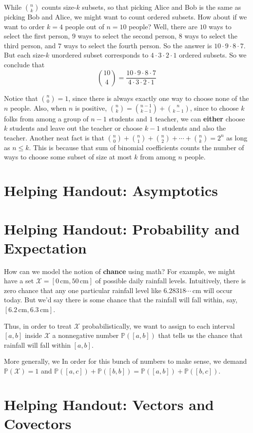 \documentclass{article}
\newcommand{\PP}{\mathbb{P}}
\newcommand{\Xx}{\mathcal{X}}
\begin{document}
        While ${n\choose k}$ counts size-$k$ subsets, so that picking Alice 
        and Bob is the same as picking Bob and Alice, we might want to count
        ordered subsets.
        How about if we want to order $k=4$ people out of $n=10$ people?
        Well, there are $10$ ways to select the first person,
                         $9$ ways to select the second person,
                         $8$ ways to select the third person, and
                         $7$ ways to select the fourth person.
        So the answer is $10\cdot 9\cdot 8\cdot 7$.
        But each size-$k$ unordered subset corresponds to
        $4\cdot 3\cdot 2\cdot 1$ ordered subsets.  So we conclude that
        $$
            {10\choose 4} = \frac{10\cdot 9\cdot 8\cdot 7}{4\cdot 3\cdot 2\cdot 1} 
        $$

        Notice that ${n \choose 0} = 1$, since there is always exactly one way
        to choose none of the $n$ people.
        Also, when $n$ is positive, ${n\choose k} = {n-1\choose k-1} +
        {n\choose k-1}$, since to choose $k$ folks from among a group of $n-1$
        students and $1$ teacher, we can \textbf{either} choose $k$ students
        and leave out the teacher or choose $k-1$ students and also the
        teacher.
        Another neat fact is that
        $
            {n\choose 0} + {n\choose 1} + {n\choose 2} + \cdots + {n\choose k}
            = 2^n
        $
        as long as $n\leq k$.  This is because that sum of binomial
        coefficients counts the number of ways to choose some subset of size at
        most $k$ from among $n$ people.  

    \section*{Helping Handout: Asymptotics}
    \section*{Helping Handout: Probability and Expectation}
        How can we model the notion of \textbf{chance} using math?
        For example, we might have a set $\Xx=[0\,\text{cm}, 50\,\text{cm}]$ of
        possible daily rainfall levels.  Intuitively, there is zero chance that
        any one particular rainfall level like $6.28318\cdots\,\text{cm}$ will
        occur today.  But we'd say there is some chance that the rainfall will
        fall within, say, $[6.2\,\text{cm}, 6.3\,\text{cm}]$.

        Thus, in order to treat $\Xx$ probabilistically, we want to assign to
        each interval $[a,b]$ inside $\Xx$ a nonnegative number $\PP([a,b])$
        that tells us the chance that rainfall will fall within $[a,b]$.

        More generally, we  
        In
        order for this bunch of numbers to make sense, we demand $\PP(\Xx)=1$
        and $\PP([a,c]) + \PP([b,b]) = \PP([a,b])+\PP([b,c])$.

    \section*{Helping Handout: Vectors and Covectors}
    
\end{document}
